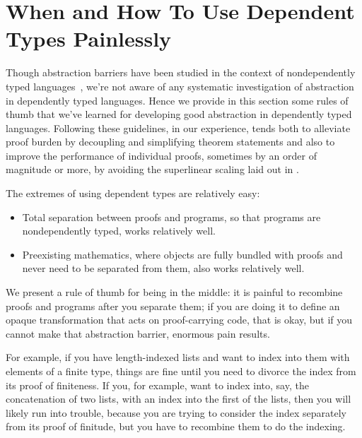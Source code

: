 \section{When and How To Use Dependent Types Painlessly}\label{sec:when-how-dependent-types}
Though abstraction barriers have been studied in the context of nondependently typed languages~\cite{Structure1996Sussman}, we're not aware of any systematic investigation of abstraction in dependently typed languages.
Hence we provide in this section some rules of thumb that we've learned for developing good abstraction in dependently typed languages.
Following these guidelines, in our experience, tends both to alleviate proof burden by decoupling and simplifying theorem statements and also to improve the performance of individual proofs, sometimes by an order of magnitude or more, by avoiding the superlinear scaling laid out in .

The extremes of using dependent types are relatively easy:
\begin{itemize}
\item
  Total separation between proofs and programs, so that programs are nondependently typed, works relatively well.
\item
  Preexisting mathematics, where objects are fully bundled with proofs and never need to be separated from them, also works relatively well.
\end{itemize}

We present a rule of thumb for being in the middle:
it is painful to recombine proofs and programs after you separate them;
if you are doing it to define an opaque transformation that acts on proof-carrying code, that is okay, but if you cannot make that abstraction barrier, enormous pain results.

For example, if you have length-indexed lists and want to index into them with elements of a finite type, things are fine until you need to divorce the index from its proof of finiteness.
If you, for example, want to index into, say, the concatenation of two lists, with an index into the first of the lists, then you will likely run into trouble, because you are trying to consider the index separately from its proof of finitude, but you have to recombine them to do the indexing.

